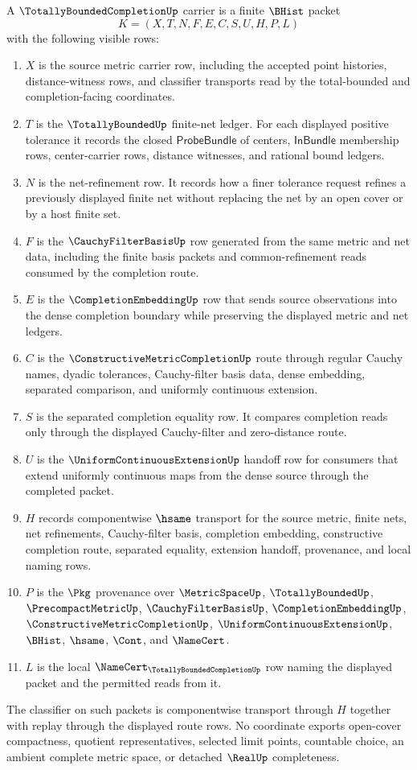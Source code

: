 \begin{definition}
\label{def:totally-bounded-completion-carrier}
A $\TotallyBoundedCompletionUp$ carrier is a finite $\BHist$ packet
$$
K=(X,T,N,F,E,C,S,U,H,P,L)
$$
with the following visible rows:
\begin{enumerate}
\item $X$ is the source metric carrier row, including the accepted point histories, distance-witness rows, and classifier transports read by the total-bounded and completion-facing coordinates.
\item $T$ is the $\TotallyBoundedUp$ finite-net ledger. For each displayed positive tolerance it records the closed $\mathsf{ProbeBundle}$ of centers, $\mathsf{InBundle}$ membership rows, center-carrier rows, distance witnesses, and rational bound ledgers.
\item $N$ is the net-refinement row. It records how a finer tolerance request refines a previously displayed finite net without replacing the net by an open cover or by a host finite set.
\item $F$ is the $\CauchyFilterBasisUp$ row generated from the same metric and net data, including the finite basis packets and common-refinement reads consumed by the completion route.
\item $E$ is the $\CompletionEmbeddingUp$ row that sends source observations into the dense completion boundary while preserving the displayed metric and net ledgers.
\item $C$ is the $\ConstructiveMetricCompletionUp$ route through regular Cauchy names, dyadic tolerances, Cauchy-filter basis data, dense embedding, separated comparison, and uniformly continuous extension.
\item $S$ is the separated completion equality row. It compares completion reads only through the displayed Cauchy-filter and zero-distance route.
\item $U$ is the $\UniformContinuousExtensionUp$ handoff row for consumers that extend uniformly continuous maps from the dense source through the completed packet.
\item $H$ records componentwise $\hsame$ transport for the source metric, finite nets, net refinements, Cauchy-filter basis, completion embedding, constructive completion route, separated equality, extension handoff, provenance, and local naming rows.
\item $P$ is the $\Pkg$ provenance over $\MetricSpaceUp$, $\TotallyBoundedUp$, $\PrecompactMetricUp$, $\CauchyFilterBasisUp$, $\CompletionEmbeddingUp$, $\ConstructiveMetricCompletionUp$, $\UniformContinuousExtensionUp$, $\BHist$, $\hsame$, $\Cont$, and $\NameCert$.
\item $L$ is the local $\NameCert_{\TotallyBoundedCompletionUp}$ row naming the displayed packet and the permitted reads from it.
\end{enumerate}
The classifier on such packets is componentwise transport through $H$ together with replay through the displayed route rows. No coordinate exports open-cover compactness, quotient representatives, selected limit points, countable choice, an ambient complete metric space, or detached $\RealUp$ completeness.
\end{definition}
